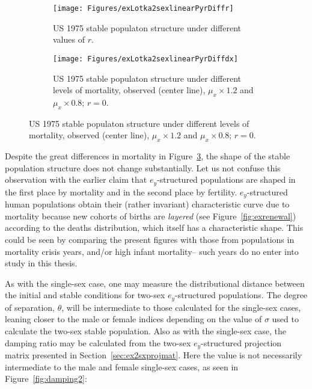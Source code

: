 \begin{figure}[!ht]
        \centering
        \begin{subfigure}
            \centering
            \caption{US 1975 stable populaton structure under
          different values of $r$.}
        	\label{fig:cystabler}
                \texttt{[image: Figures/exLotka2sexlinearPyrDiffr]}
        \end{subfigure}
        \begin{subfigure}
            \centering
            \caption{US 1975 stable populaton structure under
          different levels of mortality, observed (center line), $\mu_x \times
          1.2$ and $\mu_x \times 0.8$; $r=0$.}
            \label{fig:cystabledx}
                \texttt{[image: Figures/exLotka2sexlinearPyrDiffdx]}
        \end{subfigure}
\end{figure}
\FloatBarrier
Despite the great differences in mortality in Figure~\ref{fig:cystabledx}, the
shape of the stable population structure does not change substantially. Let us
not confuse this observation with the earlier claim that $e_y$-structured
populations are shaped in the first place by mortality and in the second place
by fertility. $e_y$-structured human populations obtain their
(rather invariant) characteristic curve due to mortality because new cohorts of
births are \textit{layered} (see Figure~\ref{fig:exrenewal}) according to the
deaths distribution, which itself has a characteristic shape. This could be seen
by comparing the present figures with those from populations in mortality crisis
years, and/or high infant mortality-- such years do no enter into study in this
thesis.

As with the single-sex case, one may measure the distributional distance between
the initial and stable conditions for two-sex $e_y$-structured populations. The
degree of separation, $\theta$, will be intermediate to those calculated for the 
single-sex cases, leaning closer to the male or
female indices depending on the value of $\sigma$ used to calculate the two-sex
stable population. Also as with the single-sex case, the damping
ratio may be calculated from the two-sex $e_y$-structured projection matrix 
presented in Section~\ref{sec:ex2sxprojmat}. Here the value is not
necessarily intermediate to the male and female single-sex cases, as seen in
Figure~\ref{fig:damping2}:

